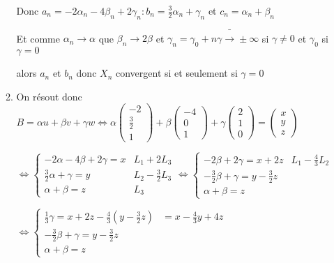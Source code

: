 \documentclass[a4paper, 11pt,reqno]{article}
\begin{document}
\begin{enumerate}
\begin{enumerate}
Donc $a_{n}=-2\alpha _{n}-4\beta _{n}+2\gamma _{n}:b_{n}=\frac{3}{2}\alpha
_{n}+\gamma _{n}$ et $c_{n}=\alpha _{n}+\beta _{n}$

Et comme $\alpha _{n}\rightarrow \alpha $ que $\beta _{n}\rightarrow 2\beta $
et $\gamma _{n}=\gamma _{0}+n\gamma \bar{\rightarrow}\pm \infty $ si $\gamma
\ne 0$ et $\gamma _{0}$ si $\gamma =0$

alors $a_{n}$ et $b_{n}$ donc $X_{n}$ convergent si et seulement si $\gamma
=0$

\item On r\'{e}sout donc $B=\alpha u+\beta v+\gamma w\Leftrightarrow \alpha
\left( 
\begin{array}{c}
-2 \\ 
\frac{3}{2} \\ 
1%
\end{array}
\right) +\beta \left( 
\begin{array}{c}
-4 \\ 
0 \\ 
1%
\end{array}
\right) +\gamma \left( 
\begin{array}{c}
2 \\ 
1 \\ 
0%
\end{array}
\right) =\left( 
\begin{array}{c}
x \\ 
y \\ 
z%
\end{array}
\right) $

$\Leftrightarrow \left\{ 
\begin{array}{cc}
-2\alpha -4\beta +2\gamma =x & L_{1}+2L_{3} \\ 
\frac{3}{2}\alpha +\gamma =y & L_{2}-\frac{3}{2}L_{3} \\ 
\alpha +\beta =z & L_{3}%
\end{array}
\right. \Leftrightarrow \left\{ 
\begin{array}{cc}
-2\beta +2\gamma =x+2z & L_{1}-\frac{4}{3}L_{2} \\ 
-\frac{3}{2}\beta +\gamma =y-\frac{3}{2}z &  \\ 
\alpha +\beta =z & 
\end{array}
\right. $

$\Leftrightarrow \left\{ 
\begin{array}{cc}
\frac{1}{3}\gamma =x+2z-\frac{4}{3}\left( y-\frac{3}{2}z\right) & =x-\frac{4%
}{3}y+4z \\ 
-\frac{3}{2}\beta +\gamma =y-\frac{3}{2}z &  \\ 
\alpha +\beta =z & 
\end{array}
\right. $


\end{enumerate}
\end{enumerate}
\end{document}
